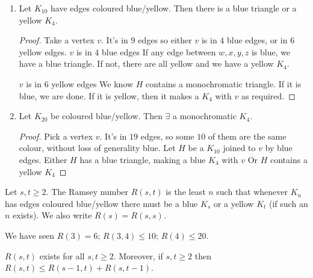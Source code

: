 \documentclass{article}
\begin{document}
\begin{eg}
    \leavevmode
    \begin{enumerate}
        \item Let $K_{10}$ have edges coloured blue/yellow.
            Then there is a blue triangle or a yellow $K_4$.
            \begin{proof}
                Take a vertex $v$. It's in $9$ edges so either $v$ is in $4$ blue edges, or in $6$ yellow edges.
                $v$ is in $4$ blue edges
                If any edge between $w, x, y, z$ is blue, we have a blue triangle.
                If not, there are all yellow and we have a yellow $K_4$.

                $v$ is in $6$ yellow edges We know $H$ contains a monochromatic triangle. If it is blue, we are done.  If it is yellow, then it makes a $K_4$ with $v$ as required.
            \end{proof}
        \item Let $K_{20}$ be coloured blue/yellow. Then $\exists$ a monochromatic $K_4$.
            \begin{proof}
                Pick a vertex $v$. It's in $19$ edges, so some $10$ of them are the same colour, without loss of generality blue.
                Let $H$ be a $K_{10}$ joined to $v$ by blue edges.
                Either $H$ has a blue triangle, making a blue $K_4$ with $v$
                Or $H$ contains a yellow $K_4$
            \end{proof}
    \end{enumerate}
\end{eg}

\begin{defi}
    Let $s, t \geq 2$. The Ramsey number $R(s, t)$ is the least $n$ such that whenever $K_n$ has edges coloured blue/yellow there must be a blue $K_s$ or a yellow $K_t$ (if such an $n$ exists).
    We also write $R(s) = R(s, s)$.
\end{defi}

We have seen $R(3) = 6$; $R(3, 4) \leq 10$; $R(4) \leq 20$.

\begin{nthm}
    $R(s, t)$ exists for all $s, t \geq 2$.  Moreover, if $s, t \geq 2$ then $R(s, t) \leq R(s-1, t) + R(s, t-1)$.
\end{nthm}
\end{document}
